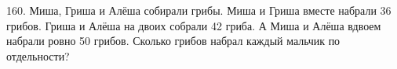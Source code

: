 160. Миша, Гриша и Алёша собирали грибы. Миша и Гриша вместе набрали 36 грибов. Гриша и Алёша на двоих собрали 42 гриба. А Миша и Алёша вдвоем набрали ровно 50 грибов. Сколько грибов набрал каждый мальчик по отдельности?\\
